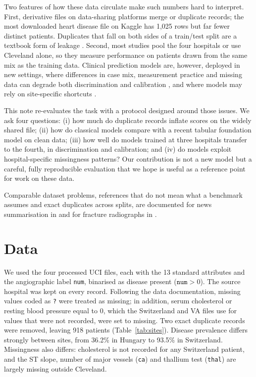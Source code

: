 \documentclass[11pt]{article}
\begin{document}
Two features of how these data circulate make such numbers hard to interpret. First, derivative files on data-sharing platforms merge or duplicate records; the most downloaded heart disease file on Kaggle \citep{lapp2019kaggle} has 1,025 rows but far fewer distinct patients. Duplicates that fall on both sides of a train/test split are a textbook form of leakage \citep{kapoor2023leakage}. Second, most studies pool the four hospitals or use Cleveland alone, so they measure performance on patients drawn from the same mix as the training data. Clinical prediction models are, however, deployed in new settings, where differences in case mix, measurement practice and missing data can degrade both discrimination and calibration \citep{vancalster2019calibration,collins2024tripodai}, and where models may rely on site-specific shortcuts \citep{geirhos2020shortcut,zech2018variable}.

This note re-evaluates the task with a protocol designed around those issues. We ask four questions: (i) how much do duplicate records inflate scores on the widely shared file; (ii) how do classical models compare with a recent tabular foundation model \citep{hollmann2025tabpfn} on clean data; (iii) how well do models trained at three hospitals transfer to the fourth, in discrimination and calibration; and (iv) do models exploit hospital-specific missingness patterns? Our contribution is not a new model but a careful, fully reproducible evaluation that we hope is useful as a reference point for work on these data.

Comparable dataset problems, references that do not mean what a benchmark assumes and exact duplicates across splits, are documented for news summarisation in \citep{hussain2026newssum} and for fracture radiographs in \citep{hussain2026fracatlas}.

\section{Data}
We used the four processed UCI files, each with the 13 standard attributes and the angiographic label \texttt{num}, binarised as disease present ($\texttt{num}>0$). The source hospital was kept on every record. Following the data documentation, missing values coded as \texttt{?} were treated as missing; in addition, serum cholesterol or resting blood pressure equal to 0, which the Switzerland and VA files use for values that were not recorded, were set to missing. Two exact duplicate records were removed, leaving 918 patients (Table~\ref{tab:sites}). Disease prevalence differs strongly between sites, from 36.2\% in Hungary to 93.5\% in Switzerland. Missingness also differs: cholesterol is not recorded for any Switzerland patient, and the ST slope, number of major vessels (\texttt{ca}) and thallium test (\texttt{thal}) are largely missing outside Cleveland.
\end{document}
